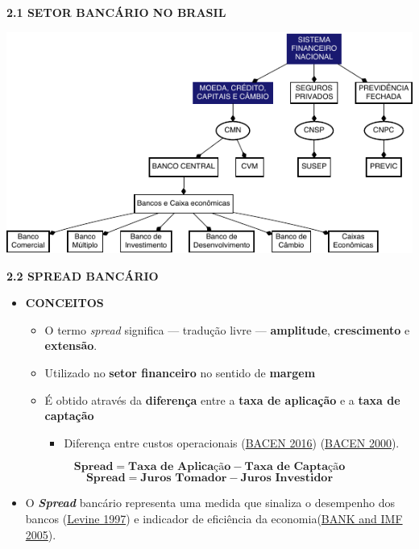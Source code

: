 \documentclass[
  ignorenonframetext,
  aspectratio=169,
  ignorenonframetext]{beamer}
\providecommand{\tightlist}{%
  \setlength{\itemsep}{0pt}\setlength{\parskip}{0pt}}
\begin{document}
\begin{frame}{\textbf{2.1 SETOR BANCÁRIO NO BRASIL}}
\protect\hypertarget{setor-bancuxe1rio-no-brasil-1}{}
\begin{center}\includegraphics{02-final_presentation-V1_files/figure-beamer/diagram.sfn-1} \end{center}
\end{frame}

\begin{frame}{\textbf{2.2 SPREAD BANCÁRIO}}
\protect\hypertarget{spread-bancuxe1rio}{}
\begin{itemize}
\tightlist
\item
  \textbf{CONCEITOS}

  \begin{itemize}
  \tightlist
  \item
    O termo \emph{spread} significa --- tradução livre ---
    \textbf{amplitude}, \textbf{crescimento} e \textbf{extensão}.
  \item
    Utilizado no \textbf{setor financeiro} no sentido de \textbf{margem}
  \item
    É obtido através da \textbf{diferença} entre a \textbf{taxa de
    aplicação} e a \textbf{taxa de captação}

    \begin{itemize}
    \tightlist
    \item
      Diferença entre custos operacionais
      (\protect\hyperlink{ref-BCB:2016}{BACEN 2016})
      (\protect\hyperlink{ref-BCB:2000}{BACEN 2000}).
    \end{itemize}
  \end{itemize}
\end{itemize}

\[ 
\textbf{Spread} = \textbf{Taxa de Aplicação} - \textbf{Taxa de Captação}
\] \[
\textbf{Spread} = \textbf{Juros Tomador} - \textbf{Juros Investidor}
\]

\begin{itemize}
\tightlist
\item
  O \textbf{\emph{Spread}} bancário representa uma medida que sinaliza o
  desempenho dos bancos (\protect\hyperlink{ref-levine:1997}{Levine
  1997}) e indicador de eficiência da
  economia(\protect\hyperlink{ref-WB:2005}{BANK and IMF 2005}).
\end{itemize}
\end{frame}
\end{document}
